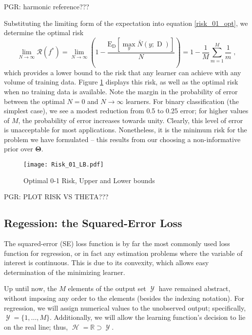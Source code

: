 \documentclass[12pt]{report}
\DeclareMathOperator{\Drm}{\mathrm{D}}
\DeclareMathOperator{\Ycal}{\mathcal{Y}}
\DeclareMathOperator{\Hcal}{\mathcal{H}}
\begin{document}
PGR: harmonic reference???

Substituting the limiting form of the expectation into equation \eqref{risk_01_opt}, we determine the optimal risk
\begin{equation}
\lim_{N \to \infty} \mathcal{R}(f^*)  = \lim_{N \to \infty} \left( 1 - \frac{\text{E}_{\Drm} \left[ \max_y \bar{N}(y;\Drm) \right]}{N} \right) = 1 - \frac{1}{M} \sum_{m=1}^M \frac{1}{m} \;,
\end{equation}
which provides a lower bound to the risk that any learner can achieve with any volume of training data. Figure \ref{fig:Risk_01_LB} displays this risk, as well as the optimal risk when no training data is available. Note the margin in the probability of error between the optimal $N=0$ and $N \to \infty$ learners. For binary classification (the simplest case), we see a modest reduction from 0.5 to 0.25 error; for higher values of $M$, the probability of error increases towards unity. Clearly, this level of error is unacceptable for most applications. Nonetheless, it is the minimum risk for the problem we have formulated -- this results from our choosing a non-informative prior over $\bm{\Theta}$.

\begin{figure}
\centering
\texttt{[image: Risk\_01\_LB.pdf]}
\caption{Optimal 0-1 Risk, Upper and Lower bounds}
\label{fig:Risk_01_LB}
\end{figure}

PGR: PLOT RISK VS THETA???



\subsection{Regession: the Squared-Error Loss}

The squared-error (SE) loss function is by far the most commonly used loss function for regression, or in fact any estimation problems where the variable of interest is continuous. This is due to its convexity, which allows easy determination of the minimizing learner. 

Up until now, the $M$ elements of the output set $\Ycal$ have remained abstract, without imposing any order to the elements (besides the indexing notation). For regression, we will assign numerical values to the unobserved output; specifically, $\Ycal = \{1,\ldots,M\}$. Additionally, we will allow the learning function's decision to lie on the real line; thus, $\Hcal = \mathbb{R} \supset \Ycal$.
\end{document}
